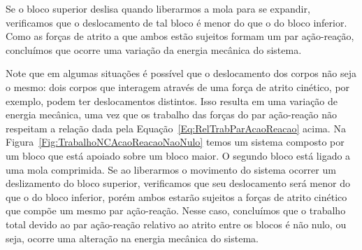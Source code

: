 \begin{marginfigure}[1cm]
\centering
{}
\caption{Se o bloco superior deslisa quando liberarmos a mola para se expandir, verificamos que o deslocamento de tal bloco é menor do que o do bloco inferior. Como as forças de atrito a que ambos estão sujeitos formam um par ação-reação, concluímos que ocorre uma variação da energia mecânica do sistema. \label{Fig:TrabalhoNCAcaoReacaoNaoNulo}}
\end{marginfigure}

Note que em algumas situações é possível que o deslocamento dos corpos não seja o mesmo: dois corpos que interagem através de uma força de atrito cinético, por exemplo, podem ter deslocamentos distintos. Isso resulta em uma variação de energia mecânica, uma vez que os trabalho das forças do par ação-reação não respeitam a relação dada pela Equação~\eqref{Eq:RelTrabParAcaoReacao} acima. Na Figura~\ref{Fig:TrabalhoNCAcaoReacaoNaoNulo} temos um sistema composto por um bloco que está apoiado sobre um bloco maior. O segundo bloco está ligado a uma mola comprimida. Se ao liberarmos o movimento do sistema ocorrer um deslizamento do bloco superior, verificamos que seu deslocamento será menor do que o do bloco inferior, porém ambos estarão sujeitos a forças de atrito cinético que compõe um mesmo par ação-reação. Nesse caso, concluímos que o trabalho total devido ao par ação-reação relativo ao atrito entre os blocos é não nulo, ou seja, ocorre uma alteração na energia mecânica do sistema.

